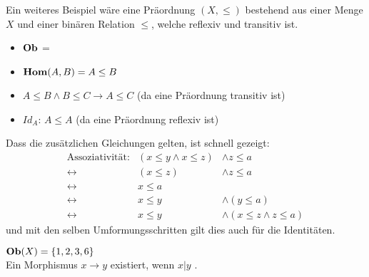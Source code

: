 \documentclass{article}
\renewcommand{\id}{\ensuremath{Id}}
\begin{document}
		 \begin{bsp}
		 Ein weiteres Beispiel w\"are eine Pr\"aordnung \( \left( X, \leq \right) \) bestehend aus einer Menge \( X \) und einer bin\"aren Relation \( \leq \), welche reflexiv und transitiv ist.
		 
		 \begin{itemize}
			 \item \( \mathbf{Ob}  \) = \BN
			 \item \(   \mathbf{Hom } (A,B) = A \leq B \)
			 \item \( A \leq B \wedge B \leq  C \rightarrow A \leq C \)  (da eine Pr\"aordnung transitiv ist) 
			 \item \( \id_A \): \( A \leq A \) (da eine  Pr\"aordnung reflexiv ist)
		 \end{itemize}
			 Dass die zus\"atzlichen Gleichungen gelten, ist schnell gezeigt:
			 \begin{eqnarray*}
			  \text{Assoziativit\"at:} &  ( x \leq y \wedge x \leq z ) & \wedge z \leq a \\
					 \leftrightarrow & (x \leq z ) & \wedge  z \leq a \\
					 \leftrightarrow & x \leq a & \\
					 \leftrightarrow & 	x \leq y  & \wedge  (y \leq a) \\
					 \leftrightarrow &   x \leq y & \wedge  (x \leq z  \wedge  z \leq a )
			 \end{eqnarray*}
			 und mit den selben Umformungsschritten gilt dies auch f\"ur die Identit\"aten.
		\end{bsp}
		
		\begin{bsp}
		
		  \cite[Beispiel 2.2.30]{Bra} 
		 \(  \mathbf{Ob} (X) = \left\lbrace 1,2,3,6 \right\rbrace \) \\
		 Ein Morphismus \(x   \to y \) existiert, wenn \( x \vert y\) . \\
		 
		   

		\end{bsp} 
		 
\end{document}
